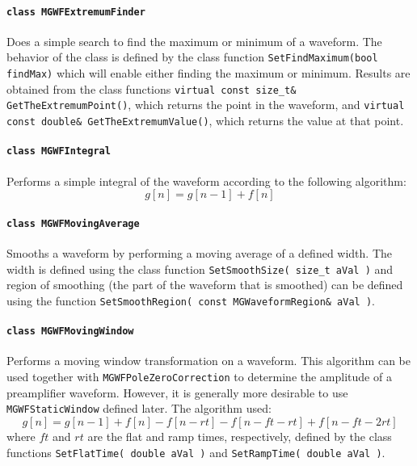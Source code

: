 			
			\paragraph{\lstinline!class MGWFExtremumFinder!} 

Does a simple search to find the maximum or minimum of a waveform.  The behavior of the class is defined by the class function \lstinline!SetFindMaximum(bool findMax)! which will enable either finding the maximum or minimum.  Results are obtained from the class functions \lstinline!virtual const size_t& GetTheExtremumPoint()!, which returns the point in the waveform, and \lstinline!virtual const double& GetTheExtremumValue()!, which returns the value at that point.

			\paragraph{\lstinline!class MGWFIntegral!} 

Performs a simple integral of the waveform according to the following algorithm:
				\[
				g[n] = g[n-1] + f[n]
				\]
			
			\paragraph{\lstinline!class MGWFMovingAverage!} 

Smooths a waveform by performing a moving average of a defined width.  The width is defined using the class function \lstinline!SetSmoothSize( size_t aVal )! and region of smoothing (the part of the waveform that is smoothed) can be defined using the function \lstinline!SetSmoothRegion( const MGWaveformRegion& aVal )!.
			
			\paragraph{\lstinline!class MGWFMovingWindow!} 

Performs a moving window transformation on a waveform.  This algorithm can be used together with \lstinline!MGWFPoleZeroCorrection! to determine the amplitude of a preamplifier waveform.  However, it is generally more desirable to use \lstinline!MGWFStaticWindow! defined later.  The algorithm used:
				\[
				g[n] = g[n-1] + f[n] - f[n-rt] - f[n-ft-rt] + f[n-ft-2rt]
				\]
where $ft$ and $rt$ are the flat and ramp times, respectively, defined by the class functions \lstinline!SetFlatTime( double aVal )! and \lstinline!SetRampTime( double aVal )!.
			

